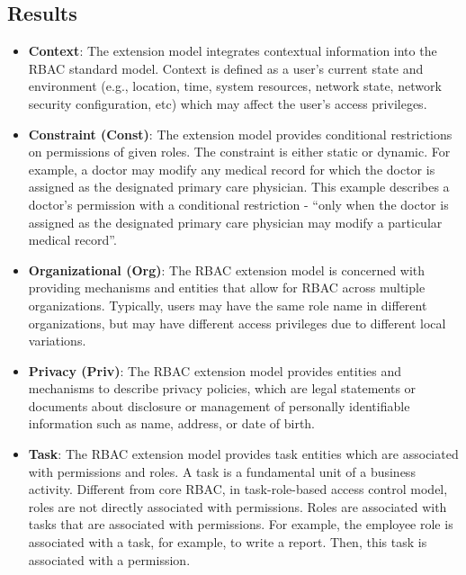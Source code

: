 \subsection{Results}

\begin{itemize}

  \item \textbf{Context}: The extension model integrates contextual information into the RBAC standard model. Context is defined as a user's current state and environment (e.g., location, time, system resources, network state, network security configuration, etc) which may affect the user's access privileges.

  \item \textbf{Constraint (Const)}: The extension model provides conditional restrictions on permissions of given roles. The constraint is either static or dynamic. For example, a doctor may modify any medical record for which the doctor is assigned as the designated primary care physician. This example describes a doctor's permission with a conditional restriction - ``only when the doctor is assigned as the designated primary care physician may modify a particular medical record''.

  \item \textbf{Organizational (Org)}: The RBAC extension model is concerned with providing mechanisms and entities that allow for RBAC across multiple organizations. Typically, users may have the same role name in different organizations, but may have different access privileges due to different local variations.
  
  \item \textbf{Privacy (Priv)}: The RBAC extension model provides entities and mechanisms to describe privacy policies, which are legal statements or documents about disclosure or management of personally identifiable information such as name, address, or date of birth.
  
  \item \textbf{Task}: The RBAC extension model provides task entities which are associated with permissions and roles. A task is a fundamental unit of a business activity. Different from core RBAC, in task-role-based access control model, roles are not directly associated with permissions. Roles are associated with tasks that are associated with permissions. For example, the employee role is associated with a task, for example, to write a report. Then, this task is associated with a permission.


\end{itemize}
